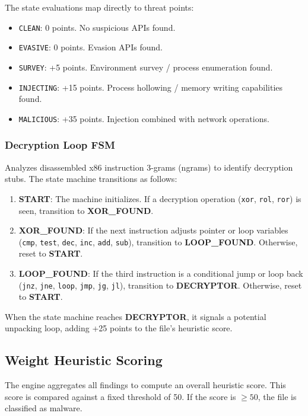 \documentclass[11pt,a4paper]{article}
\begin{document}
The state evaluations map directly to threat points:
\begin{itemize}
    \item \texttt{CLEAN}: 0 points. No suspicious APIs found.
    \item \texttt{EVASIVE}: 0 points. Evasion APIs found.
    \item \texttt{SURVEY}: +5 points. Environment survey / process enumeration found.
    \item \texttt{INJECTING}: +15 points. Process hollowing / memory writing capabilities found.
    \item \texttt{MALICIOUS}: +35 points. Injection combined with network operations.
\end{itemize}

\subsubsection{Decryption Loop FSM}
Analyzes disassembled x86 instruction 3-grams (ngrams) to identify decryption stubs. The state machine transitions as follows:
\begin{enumerate}
    \item \textbf{START}: The machine initializes. If a decryption operation (\texttt{xor}, \texttt{rol}, \texttt{ror}) is seen, transition to \textbf{XOR\_FOUND}.
    \item \textbf{XOR\_FOUND}: If the next instruction adjusts pointer or loop variables (\texttt{cmp}, \texttt{test}, \texttt{dec}, \texttt{inc}, \texttt{add}, \texttt{sub}), transition to \textbf{LOOP\_FOUND}. Otherwise, reset to \textbf{START}.
    \item \textbf{LOOP\_FOUND}: If the third instruction is a conditional jump or loop back (\texttt{jnz}, \texttt{jne}, \texttt{loop}, \texttt{jmp}, \texttt{jg}, \texttt{jl}), transition to \textbf{DECRYPTOR}. Otherwise, reset to \textbf{START}.
\end{enumerate}
When the state machine reaches \textbf{DECRYPTOR}, it signals a potential unpacking loop, adding +25 points to the file's heuristic score.

\subsection{Weight Heuristic Scoring}
The engine aggregates all findings to compute an overall heuristic score. This score is compared against a fixed threshold of 50. If the score is $\ge 50$, the file is classified as malware.
\end{document}

